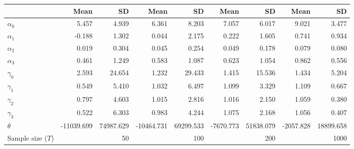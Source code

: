 
\begin{tabular}[t]{lrrrrrrrr}
\toprule
  & Mean & SD & Mean  & SD  & Mean   & SD   & Mean    & SD   \\
\midrule
$\alpha_{0}$ & 5.457 & 4.939 & 6.361 & 8.203 & 7.057 & 6.017 & 9.021 & 3.477\\
$\alpha_{1}$ & -0.188 & 1.302 & 0.044 & 2.175 & 0.222 & 1.605 & 0.741 & 0.934\\
$\alpha_{2}$ & 0.019 & 0.304 & 0.045 & 0.254 & 0.049 & 0.178 & 0.079 & 0.080\\
$\alpha_{3}$ & 0.461 & 1.249 & 0.583 & 1.087 & 0.623 & 1.054 & 0.862 & 0.556\\
$\gamma_{0}$ & 2.593 & 24.654 & 1.232 & 29.433 & 1.415 & 15.536 & 1.434 & 5.204\\
$\gamma_{1}$ & 0.549 & 5.410 & 1.032 & 6.497 & 1.099 & 3.329 & 1.109 & 0.667\\
$\gamma_{2}$ & 0.797 & 4.603 & 1.015 & 2.816 & 1.016 & 2.150 & 1.059 & 0.380\\
$\gamma_{3}$ & 0.522 & 6.303 & 0.983 & 4.244 & 1.075 & 2.168 & 1.056 & 0.407\\
$\theta$ & -11039.699 & 74987.629 & -10464.731 & 69299.533 & -7670.773 & 51838.079 & -2057.828 & 18899.658\\
Sample size ($T$) &  & 50 &  & 100 &  & 200 &  & 1000\\
\bottomrule
\end{tabular}
